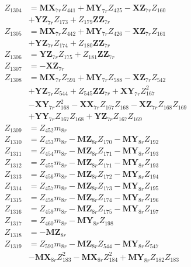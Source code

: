 \begin{multicols}{2}
\begin{align}
Z_{1304} &= \mathbf{MX}_{7r}Z_{441} + \mathbf{MY}_{7r}Z_{425} - \mathbf{XZ}_{7r}Z_{160}  \nonumber \\
&+ \mathbf{YZ}_{7r}Z_{173} + Z_{179}\mathbf{ZZ}_{7r} \nonumber \\
Z_{1305} &= \mathbf{MX}_{7r}Z_{442} + \mathbf{MY}_{7r}Z_{426} - \mathbf{XZ}_{7r}Z_{161}  \nonumber \\
&+ \mathbf{YZ}_{7r}Z_{174} + Z_{180}\mathbf{ZZ}_{7r} \nonumber \\
Z_{1306} &= \mathbf{YZ}_{7r}Z_{175} + Z_{181}\mathbf{ZZ}_{7r} \nonumber \\
Z_{1307} &= -\mathbf{XZ}_{7r} \nonumber \\
Z_{1308} &= \mathbf{MX}_{7r}Z_{591} + \mathbf{MY}_{7r}Z_{588} - \mathbf{XZ}_{7r}Z_{542}  \nonumber \\
&+ \mathbf{YZ}_{7r}Z_{544} + Z_{545}\mathbf{ZZ}_{7r} + \mathbf{XY}_{7r}Z_{167}^2  \nonumber \\
&- \mathbf{XY}_{7r}Z_{168}^2 - \mathbf{XX}_{7r}Z_{167}Z_{168} - \mathbf{XZ}_{7r}Z_{168}Z_{169}  \nonumber \\
&+ \mathbf{YY}_{7r}Z_{167}Z_{168} + \mathbf{YZ}_{7r}Z_{167}Z_{169} \nonumber \\
Z_{1309} &= Z_{452}m_{8r} \nonumber \\
Z_{1310} &= Z_{453}m_{8r} - \mathbf{MZ}_{8r}Z_{170} - \mathbf{MY}_{8r}Z_{192} \nonumber \\
Z_{1311} &= Z_{454}m_{8r} - \mathbf{MZ}_{8r}Z_{171} - \mathbf{MY}_{8r}Z_{193} \nonumber \\
Z_{1312} &= Z_{455}m_{8r} - \mathbf{MZ}_{8r}Z_{171} - \mathbf{MY}_{8r}Z_{193} \nonumber \\
Z_{1313} &= Z_{456}m_{8r} - \mathbf{MZ}_{8r}Z_{172} - \mathbf{MY}_{8r}Z_{194} \nonumber \\
Z_{1314} &= Z_{457}m_{8r} - \mathbf{MZ}_{8r}Z_{173} - \mathbf{MY}_{8r}Z_{195} \nonumber \\
Z_{1315} &= Z_{458}m_{8r} - \mathbf{MZ}_{8r}Z_{174} - \mathbf{MY}_{8r}Z_{196} \nonumber \\
Z_{1316} &= Z_{459}m_{8r} - \mathbf{MZ}_{8r}Z_{175} - \mathbf{MY}_{8r}Z_{197} \nonumber \\
Z_{1317} &= Z_{460}m_{8r} - \mathbf{MY}_{8r}Z_{198} \nonumber \\
Z_{1318} &= -\mathbf{MZ}_{8r} \nonumber \\
Z_{1319} &= Z_{593}m_{8r} - \mathbf{MZ}_{8r}Z_{544} - \mathbf{MY}_{8r}Z_{547}  \nonumber \\
&- \mathbf{MX}_{8r}Z_{183}^2 - \mathbf{MX}_{8r}Z_{184}^2 + \mathbf{MY}_{8r}Z_{182}Z_{183}  \nonumber \\

\end{align}
\end{multicols}

